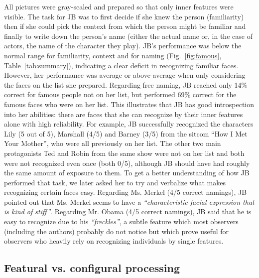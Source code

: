 \documentclass[fleqn,10pt]{SelfArx} %
\begin{document}
All pictures were gray-scaled and prepared so that only inner features were visible. The task for JB was to first decide if she knew the person (familiarity) then if she could pick the context from which the person might be familiar and finally to write down the person's name (either the actual name or, in the case of actors, the name of the character they play).
JB's performance was below the normal range for familiarity, context and for naming (Fig.~\ref{fig:famous}, Table~\ref{tab:summary}), indicating a clear deficit in recognizing familiar faces. However, her performance was average or above-average when only considering the faces on the list she prepared. Regarding free naming, JB reached only 14\% correct for famous people not on her list, but performed 69\% correct for the famous faces who were on her list. This illustrates that JB has good introspection into her abilities: there are faces that she can recognize by their inner features alone with high reliability. For example, JB successfully recognized the characters Lily (5 out of 5), Marshall (4/5) and Barney (3/5) from the sitcom “How I Met Your Mother”, who were all previously on her list. The other two main protagonists Ted and Robin from the same show were not on her list and both were not recognized even once (both 0/5), although JB should have had roughly the same amount of exposure to them.
To get a better understanding of how JB performed that task, we later asked her to try and verbalize what makes recognizing certain faces easy. Regarding Ms. Merkel (4/5 correct namings), JB pointed out that Ms. Merkel seems to have a \textit{“characteristic facial expression that is kind of stiff”}. Regarding Mr. Obama (4/5 correct namings), JB said that he is easy to recognize due to his \textit{“freckles”}, a subtle feature which most observers (including the authors) probably do not notice but which prove useful for observers who heavily rely on recognizing individuals by single features.


\subsection*{Featural vs. configural processing}
\end{document}
